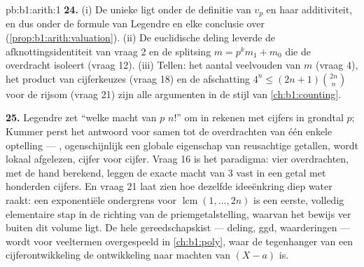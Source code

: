\begin{solution}{pb:b1:arith:1}
\textbf{24.} (i) De unieke  ligt onder de definitie van
$v_p$ en haar additiviteit, en dus onder de formule van Legendre en elke
conclusie over  (\cref{prop:b1:arith:valuation}). (ii) De
euclidische deling leverde de afknottingsidentiteit van vraag 2 en de
splitsing $m = p^km_1 + m_0$ die de overdracht isoleert (vraag 12). (iii)
Tellen: het aantal veelvouden van $m$ (vraag 4), het product van
cijferkeuzes (vraag 18) en de afschatting $4^n \leq (2n+1)\binom{2n}n$
voor de rijsom (vraag 21) zijn alle argumenten in de stijl van
\cref{ch:b1:counting}.

\textbf{25.} Legendre zet ``welke macht van $p$  $n!$'' om in rekenen
met cijfers in grondtal $p$; Kummer perst het antwoord voor
 samen tot de overdrachten van één enkele optelling
--- , ogenschijnlijk een globale eigenschap van reusachtige
getallen, wordt lokaal afgelezen, cijfer voor cijfer. Vraag 16 is het
paradigma: vier overdrachten, met de hand berekend, leggen de exacte macht
van $3$ vast in een getal met honderden cijfers. En vraag 21 laat zien
hoe dezelfde ideeënkring diep water raakt: een exponentiële ondergrens
voor $\operatorname{lcm}(1, \dots, 2n)$ is een eerste, volledig
elementaire stap in de richting van de priemgetalstelling, waarvan het
bewijs ver buiten dit volume ligt. De hele gereedschapskist --- deling,
ggd, waarderingen --- wordt voor veeltermen overgespeeld in
\cref{ch:b1:poly}, waar de tegenhanger van een cijferontwikkeling de
ontwikkeling naar machten van $(X - a)$ is.
\end{solution}

